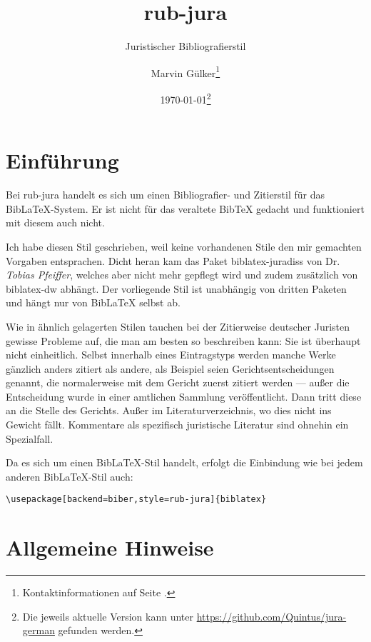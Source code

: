 \documentclass[11pt,a4paper,DIV=calc]{scrartcl}
\newcommand\software[1]{\textsf{#1}}
\newcommand\rj{\software{rub-jura}\xspace}
\newcommand\Biblatex{\software{Bib\LaTeX{}}\xspace}
\newcommand\name[1]{\textit{#1}}
\begin{document}
\title{rub-jura}
\subtitle{Juristischer Bibliografierstil}
\author{Marvin Gülker\footnote{Kontaktinformationen auf Seite \pageref{sec:kontakt}.}}
\date{\today\footnote{Die jeweils aktuelle Version kann unter
    \url{https://github.com/Quintus/jura-german} gefunden werden.}}
\maketitle{}

\tableofcontents{}
\listoftables{}

\section{Einführung}

Bei \rj handelt es sich um einen Bibliografier- und Zitierstil für das
\Biblatex-System. Er ist nicht für das veraltete \software{Bib\TeX{}}
gedacht und funktioniert mit diesem auch nicht.

Ich habe diesen Stil geschrieben, weil keine vorhandenen Stile den mir
gemachten Vorgaben entsprachen. Dicht heran kam das Paket
\software{biblatex-juradiss} von Dr. \name{Tobias Pfeiffer}, welches
aber nicht mehr gepflegt wird und zudem zusätzlich von
\software{biblatex-dw} abhängt. Der vorliegende Stil ist unabhängig
von dritten Paketen und hängt nur von \Biblatex selbst ab.

Wie in ähnlich gelagerten Stilen tauchen bei der Zitierweise deutscher
Juristen gewisse Probleme auf, die man am besten so beschreiben kann:
Sie ist überhaupt nicht einheitlich. Selbst innerhalb eines
Eintragstyps werden manche Werke gänzlich anders zitiert als andere,
als Beispiel seien Gerichtsentscheidungen genannt, die normalerweise
mit dem Gericht zuerst zitiert werden — außer die Entscheidung wurde
in einer amtlichen Sammlung veröffentlicht. Dann tritt diese an die
Stelle des Gerichts. Außer im Literaturverzeichnis, wo dies nicht ins
Gewicht fällt. Kommentare als spezifisch juristische Literatur sind
ohnehin ein Spezialfall.

Da es sich um einen \Biblatex-Stil handelt, erfolgt die Einbindung wie
bei jedem anderen \Biblatex-Stil auch:

\begin{verbatim}
\usepackage[backend=biber,style=rub-jura]{biblatex}
\end{verbatim}

\section{Allgemeine Hinweise}
\end{document}
